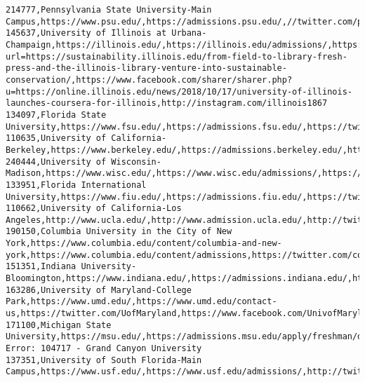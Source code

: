 \documentclass[11pt]{article}
\begin{document}
\begin{Verbatim}[commandchars=\\\{\}]
214777,Pennsylvania State University-Main Campus,https://www.psu.edu/,https://admissions.psu.edu/,//twitter.com/penn\_state,http://www.facebook.com/pennstate,http://instagram.com/pennstate
145637,University of Illinois at Urbana-Champaign,https://illinois.edu/,https://illinois.edu/admissions/,https://twitter.com/share?url=https://sustainability.illinois.edu/from-field-to-library-fresh-press-and-the-illinois-library-venture-into-sustainable-conservation/,https://www.facebook.com/sharer/sharer.php?u=https://online.illinois.edu/news/2018/10/17/university-of-illinois-launches-coursera-for-illinois,http://instagram.com/illinois1867
134097,Florida State University,https://www.fsu.edu/,https://admissions.fsu.edu/,https://twitter.com/floridastate,https://www.facebook.com/floridastate,https://instagram.com/floridastateuniversity/
110635,University of California-Berkeley,https://www.berkeley.edu/,https://admissions.berkeley.edu/,https://twitter.com/\#!/UCBerkeley,http://www.facebook.com/UCBerkeley,http://instagram.com/ucberkeleyofficial\#
240444,University of Wisconsin-Madison,https://www.wisc.edu/,https://www.wisc.edu/admissions/,https://twitter.com/uwmadison,https://facebook.com/uwmadison,https://www.instagram.com/uwmadison/
133951,Florida International University,https://www.fiu.edu/,https://admissions.fiu.edu/,https://twitter.com/fiu,https://www.facebook.com/floridainternational,https://www.instagram.com/fiuinstagram/
110662,University of California-Los Angeles,http://www.ucla.edu/,http://www.admission.ucla.edu/,http://twitter.com/ucla,http://www.facebook.com/uclabruins,http://www.instagram.com/ucla
190150,Columbia University in the City of New York,https://www.columbia.edu/content/columbia-and-new-york,https://www.columbia.edu/content/admissions,https://twitter.com/columbia,https://www.facebook.com/columbia,https://www.instagram.com/columbia/
151351,Indiana University-Bloomington,https://www.indiana.edu/,https://admissions.indiana.edu/,https://www.twitter.com/IUBloomington,https://www.facebook.com/IndianaUniversity,https://www.instagram.com/p/BpZlX6vlMdQ/
163286,University of Maryland-College Park,https://www.umd.edu/,https://www.umd.edu/contact-us,https://twitter.com/UofMaryland,https://www.facebook.com/UnivofMaryland,https://www.instagram.com/univofmaryland/
171100,Michigan State University,https://msu.edu/,https://admissions.msu.edu/apply/freshman/default.aspx,https://www.twitter.com/michiganstateu,https://www.facebook.com/spartans.msu/,https://www.instagram.com/michiganstateu
Error: 104717 - Grand Canyon University
137351,University of South Florida-Main Campus,https://www.usf.edu/,https://www.usf.edu/admissions/,http://twitter.com/USouthFlorida,http://facebook.com/USouthFlorida,http://www.instagram.com/usouthflorida

\end{Verbatim}
\end{document}
